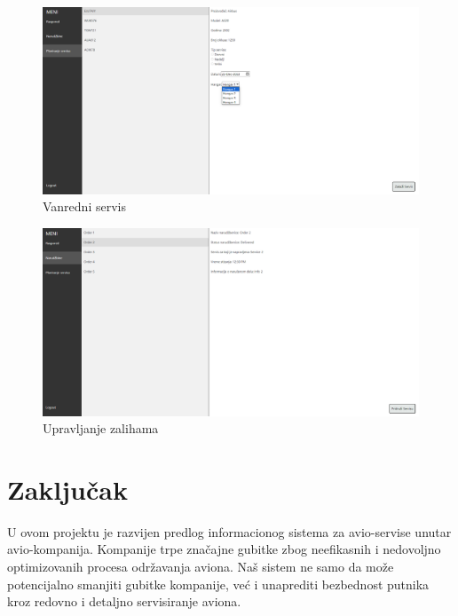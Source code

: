 \documentclass[a4paper]{article}
\begin{document}
\begin{figure}[H]
\begin{center}
\includegraphics[scale=0.3]{UI/vandredni_servis_4.png}
\end{center}
\caption{Vanredni servis}
\label{fig:ui_vanredni_4}
\end{figure}

\begin{figure}[H]
\begin{center}
\includegraphics[scale=0.3]{UI/narudzbine.png}
\end{center}
\caption{Upravljanje zalihama}
\label{fig:ui_upravljanje_zalihama}
\end{figure}

\section{Zaključak}
\label{sec:zakljucak}

U ovom projektu je razvijen predlog informacionog sistema za avio-servise unutar avio-kompanija. Kompanije trpe značajne gubitke zbog neefikasnih i nedovoljno optimizovanih procesa održavanja aviona. Naš sistem ne samo da može potencijalno smanjiti gubitke kompanije, već i unaprediti bezbednost putnika kroz redovno i detaljno servisiranje aviona.
\end{document}
